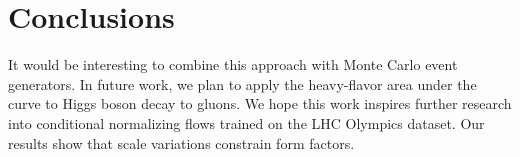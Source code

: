 \section{Conclusions}\label{sec:conclusions}

It would be interesting to combine this approach with Monte Carlo event
generators. In future work, we plan to apply the heavy-flavor area under
the curve to Higgs boson decay to gluons. We hope this work inspires
further research into conditional normalizing flows trained on the LHC
Olympics dataset. Our results show that scale variations constrain form
factors.


